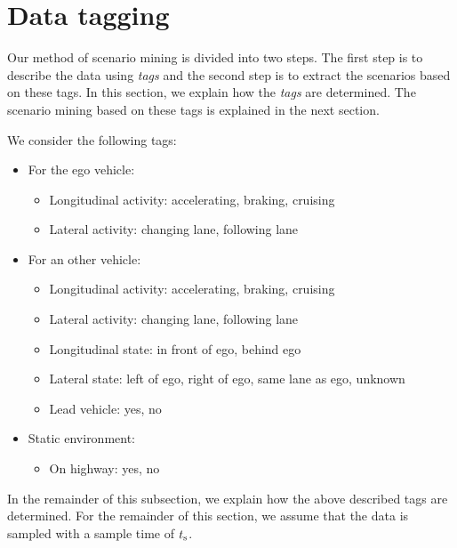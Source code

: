 \section{Data tagging}
\label{sec:tagging}

Our method of scenario mining is divided into two steps. The first step is to describe the data using \emph{tags} and the second step is to extract the scenarios based on these tags. In this section, we explain how the \emph{tags} are determined. The scenario mining based on these tags is explained in the next section.



We consider the following tags:
\begin{itemize}
	\item For the ego vehicle:
	\begin{itemize}
		\item Longitudinal activity: accelerating, braking, cruising
		\item Lateral activity: changing lane, following lane
	\end{itemize}
	\item For an other vehicle:
	\begin{itemize}
		\item Longitudinal activity: accelerating, braking, cruising
		\item Lateral activity: changing lane, following lane
		\item Longitudinal state: in front of ego, behind ego
		\item Lateral state: left of ego, right of ego, same lane as ego, unknown
		\item Lead vehicle: yes, no
	\end{itemize}
	\item Static environment:
	\begin{itemize}
		\item On highway: yes, no
	\end{itemize}
\end{itemize}


In the remainder of this subsection, we explain how the above described tags are determined. 
For the remainder of this section, we assume that the data is sampled with a sample time of $t_\mathrm{s}$.



